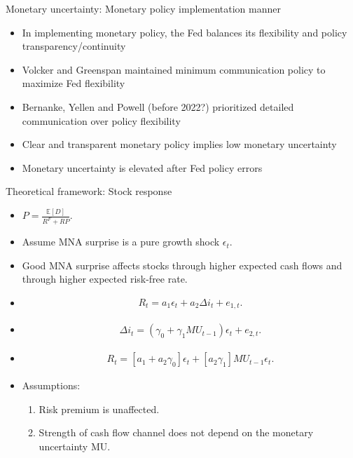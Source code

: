 \documentclass{beamer}
\begin{document}
\begin{frame}{Monetary uncertainty: Monetary policy implementation manner}
    \begin{itemize}
        \item In implementing monetary policy, the Fed balances its flexibility and policy transparency/continuity
        \item Volcker and Greenspan maintained minimum communication policy to maximize Fed flexibility
        \item Bernanke, Yellen and Powell (before 2022?) prioritized detailed communication over policy flexibility
        \item Clear and transparent monetary policy implies low monetary uncertainty
        \item Monetary uncertainty is elevated after Fed policy errors 
    \end{itemize}  
\end{frame}





\begin{frame}{Theoretical framework: Stock response}
    \begin{itemize}
    \abovedisplayskip=-\baselineskip
    \belowdisplayskip=0pt
    \abovedisplayshortskip=-\baselineskip
    \belowdisplayshortskip=0pt
        \item {$P = \frac{\mathbb{E}[D]}{R^F + RP}.$}
        \item {Assume MNA surprise is a pure growth shock $\epsilon_t$.}
        \item {Good MNA surprise affects stocks through higher expected cash flows and through higher expected risk-free rate.}
        \item 
        \begin{align}
        R_t = a_1 \epsilon_{t} + a_2 \Delta i_t + e_{1,t}.
        \end{align}
        \item 
        \begin{align}
        \Delta i_t = (\gamma_0 + \gamma_1 MU_{t-1})\epsilon_{t}+e_{2,t}.
        \end{align}
        \item 
        \begin{align}
        R_t = [a_1+a_2\gamma_0] \epsilon_{t} + [a_2 \gamma_1] MU_{t-1}\epsilon_{t}.
        \end{align}
        \item{Assumptions:}
        \begin{enumerate}
            \item {Risk premium is unaffected.}
            \item {Strength of cash flow channel does not depend on the monetary uncertainty MU.}
        \end{enumerate}
    \end{itemize}
\end{frame}
\end{document}
